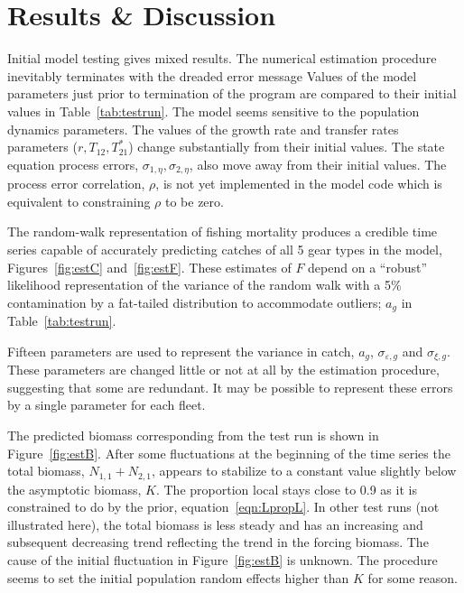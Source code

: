 \documentclass[12pt,letterpaper]{article}
\newcommand\help[1]{\color{Magenta}{\it #1 }\normalcolor}
\newcommand\Nsum{{N_{1,1}+N_{2,1}}}
\begin{document}

\section*{Results \& Discussion}
Initial model testing gives mixed results. The numerical estimation
procedure inevitably terminates with the dreaded error message 
\help{``Matrix not positive definite in Ln\_det\_choleski''.}
Values of the model parameters just prior to termination of the program are
compared to their initial values in Table~\ref{tab:testrun}.
The model seems sensitive to the population dynamics parameters. The
values of the
growth rate and transfer rates parameters ($r,T_{12}, T_{21}^*$)
change substantially from their initial values.
The state equation process errors, $\sigma_{1,\eta},\sigma_{2,\eta}$,
also move away from their initial values.
The process error correlation, $\rho$, is not yet implemented in the model
code which is equivalent to constraining $\rho$ to be zero.

The random-walk representation of fishing mortality
produces a credible time series
capable of accurately predicting catches
of all 5 gear types in the model, 
Figures~\ref{fig:estC} and~\ref{fig:estF}.
These estimates of $F$ depend on a ``robust'' likelihood representation
of the variance of the random walk with a 5\% contamination by a fat-tailed
distribution to accommodate outliers; $a_g$ in Table~\ref{tab:testrun}.

Fifteen parameters are used to represent the variance in catch, $a_g$, 
$\sigma_{\varepsilon,g}$ and $\sigma_{\xi,g}$.
These parameters are changed little or not at all by the estimation
procedure, suggesting that some are redundant.
It may be possible to represent these errors by a single parameter for
each fleet.

The predicted biomass corresponding from the test run is shown in
Figure~\ref{fig:estB}. After some fluctuations at the beginning of
the time series the total biomass, $\Nsum$, appears to stabilize to a
constant value slightly below the asymptotic biomass, $K$. The
proportion local stays close to 0.9 as it is constrained to do by the
prior, equation~\ref{eqn:LpropL}.
In other test runs (not illustrated here), 
the total biomass is less steady and has an
increasing and subsequent decreasing trend reflecting the trend in the
forcing biomass.
The cause of the initial fluctuation in
Figure~\ref{fig:estB} is unknown. The procedure seems
to set the initial population random effects higher than $K$ for some
reason.
\end{document}
